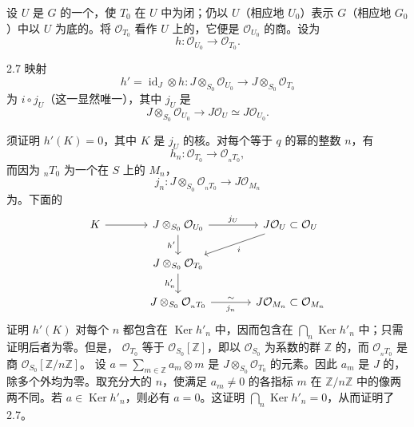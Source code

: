 设 $U$ 是 $G$ 的一个，使 $T_0$ 在 $U$ 中为闭；仍以 $U$（相应地 $U_0$）表示 $G$（相应地 $G_0$）中以 $U$ 为底的。将 $\mathcal O_{T_0}$ 看作 $U$ 上的，它便是 $\mathcal O_{U_0}$ 的商。设为
\[h:\mathcal O_{U_0}\longrightarrow\mathcal O_{T_0}.\]
\begin{SGAresult}{}{2.7}
映射
\[h'=\operatorname{id}_J\otimes h:J\otimes_{S_0}\mathcal O_{U_0}\longrightarrow J\otimes_{S_0}\mathcal O_{T_0}\]
为 $i\circ j_U$（这一显然唯一），其中 $j_U$ 是
\[J\otimes_{S_0}\mathcal O_{U_0}\longrightarrow J\mathcal O_U\simeq J\mathcal O_{U_0}.\]
\end{SGAresult}
须证明 $h'(K)=0$，其中 $K$ 是 $j_U$ 的核。对每个等于 $q$ 的幂的整数 $n$，有
\[h_n:\mathcal O_{T_0}\longrightarrow\mathcal O_{{}_nT_0},\]
而因为 ${}_nT_0$ 为一个在 $S$ 上的 $M_n$，
\[j_n:J\otimes_{S_0}\mathcal O_{{}_nT_0}\longrightarrow J\mathcal O_{M_n}\]
为。下面的
\[
\begin{tikzcd}[column sep=large]
K\arrow[r]&J\otimes_{S_0}\mathcal O_{U_0}\arrow[r,"j_U"]\arrow[d,"h'"']&J\mathcal O_U\subset\mathcal O_U\arrow[dl,"i"]\\
&J\otimes_{S_0}\mathcal O_{T_0}\arrow[d,"h'_n"']&\\
&J\otimes_{S_0}\mathcal O_{{}_nT_0}\arrow[r,"j_n"',"\sim"]&J\mathcal O_{M_n}\subset\mathcal O_{M_n}
\end{tikzcd}
\]
证明 $h'(K)$ 对每个 $n$ 都包含在 $\operatorname{Ker}h'_n$ 中，因而包含在 $\bigcap_n\operatorname{Ker}h'_n$ 中；只需证明后者为零。但是， $\mathcal O_{T_0}$ 等于 $\mathcal O_{S_0}[\mathbb Z]$，即以 $\mathcal O_{S_0}$ 为系数的群 $\mathbb Z$ 的，而 $\mathcal O_{{}_nT_0}$ 是商 $\mathcal O_{S_0}[\mathbb Z/n\mathbb Z]$。
设 $a=\sum_{m\in\mathbb Z}a_m\otimes m$ 是 $J\otimes_{S_0}\mathcal O_{T_0}$ 的元素。因此 $a_m$ 是 $J$ 的，除多个外均为零。取充分大的 $n$，使满足 $a_m\ne0$ 的各指标 $m$ 在 $\mathbb Z/n\mathbb Z$ 中的像两两不同。若 $a\in\operatorname{Ker}h'_n$，则必有 $a=0$。这证明 $\bigcap_n\operatorname{Ker}h'_n=0$，从而证明了 2.7。

